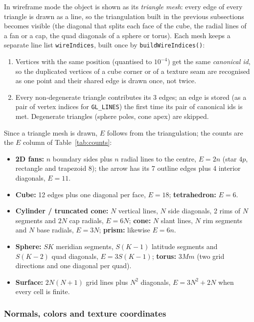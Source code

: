 \documentclass[a4paper, 11pt]{article}
\newcommand{\code}[1]{\texttt{#1}}
\begin{document}
In wireframe mode the object is shown as its \emph{triangle mesh}: every edge of every triangle is drawn as a line, so the
triangulation built in the previous subsections becomes visible (the diagonal that splits each face of the cube, the radial lines of a
fan or a cap, the quad diagonals of a sphere or torus). Each mesh keeps a separate line list \code{wireIndices}, built once by
\code{buildWireIndices()}:
\begin{enumerate}
  \item Vertices with the same position (quantised to $10^{-4}$) get the same \emph{canonical id}, so the duplicated vertices of a cube
        corner or of a texture seam are recognised as one point and their shared edge is drawn once, not twice.
  \item Every non-degenerate triangle contributes its 3 edges; an edge is stored (as a pair of vertex indices for \code{GL\_LINES})
        the first time its pair of canonical ids is met. Degenerate triangles (sphere poles, cone apex) are skipped.
\end{enumerate}
Since a triangle mesh is drawn, $E$ follows from the triangulation; the counts are the $E$ column of Table~\ref{tab:counts}:
\begin{itemize}
  \item \textbf{2D fans:} $n$ boundary sides plus $n$ radial lines to the centre, $E=2n$ (star $4p$, rectangle and trapezoid 8);
        the arrow has its 7 outline edges plus 4 interior diagonals, $E=11$.
  \item \textbf{Cube:} 12 edges plus one diagonal per face, $E=18$; \textbf{tetrahedron:} $E=6$.
  \item \textbf{Cylinder / truncated cone:} $N$ vertical lines, $N$ side diagonals, 2 rims of $N$ segments and $2N$ cap radials, $E=6N$;
        \textbf{cone:} $N$ slant lines, $N$ rim segments and $N$ base radials, $E=3N$; \textbf{prism:} likewise $E=6n$.
  \item \textbf{Sphere:} $SK$ meridian segments, $S(K-1)$ latitude segments and $S(K-2)$ quad diagonals, $E=3S(K-1)$;
        \textbf{torus:} $3Mm$ (two grid directions and one diagonal per quad).
  \item \textbf{Surface:} $2N(N+1)$ grid lines plus $N^2$ diagonals, $E=3N^2+2N$ when every cell is finite.
\end{itemize}

\subsubsection{Normals, colors and texture coordinates}
\end{document}
